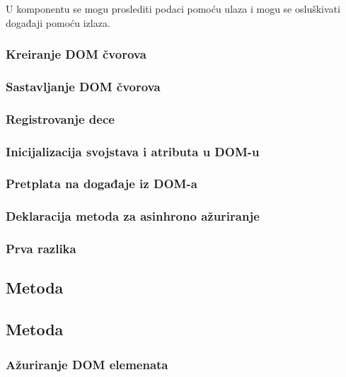 U komponentu se mogu proslediti podaci pomoću ulaza i mogu se osluškivati događaji pomoću izlaza.

\subsubsection{Kreiranje DOM čvorova}

\subsubsection{Sastavljanje DOM čvorova}

\subsubsection{Registrovanje dece}
\label{subsubsec:registrovanje-dece}

\subsubsection{Inicijalizacija svojstava i atributa u DOM-u}

\subsubsection{Pretplata na događaje iz DOM-a}

\subsubsection{Deklaracija metoda za asinhrono ažuriranje}

\subsubsection{Prva razlika}

\subsection{Metoda }
\label{subsec:metoda-diff}

\subsection{Metoda }

\subsubsection{Ažuriranje DOM elemenata}

